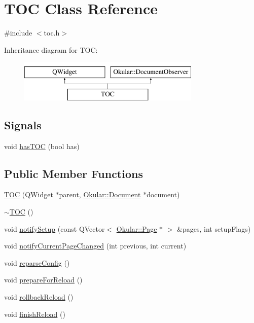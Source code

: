 \hypertarget{classTOC}{\section{T\+O\+C Class Reference}
\label{classTOC}
}


{\ttfamily \#include $<$toc.\+h$>$}

Inheritance diagram for T\+O\+C\+:\begin{figure}[H]
\begin{center}
\leavevmode
\includegraphics[height=2.000000cm]{classTOC}
\end{center}
\end{figure}
\subsection*{Signals}
\begin{DoxyCompactItemize}
\item 
void \hyperlink{classTOC_a0ec67e75322336e78c50725b8240f98e}{has\+T\+O\+C} (bool has)
\end{DoxyCompactItemize}
\subsection*{Public Member Functions}
\begin{DoxyCompactItemize}
\item 
\hyperlink{classTOC_afdab92acfa2df35fe87bdc92a09199ae}{T\+O\+C} (Q\+Widget $\ast$parent, \hyperlink{classOkular_1_1Document}{Okular\+::\+Document} $\ast$document)
\item 
\hyperlink{classTOC_a68efd9d176e9ed6aa05b9b0f9e996c7b}{$\sim$\+T\+O\+C} ()
\item 
void \hyperlink{classTOC_a131d7a59b8c1254fb54e280fb427c640}{notify\+Setup} (const Q\+Vector$<$ \hyperlink{classOkular_1_1Page}{Okular\+::\+Page} $\ast$ $>$ \&pages, int setup\+Flags)
\item 
void \hyperlink{classTOC_a3efaad78d7bec63e5dce884c4e460292}{notify\+Current\+Page\+Changed} (int previous, int current)
\item 
void \hyperlink{classTOC_a99818f663ddf48fa724aabfdadc1a516}{reparse\+Config} ()
\item 
void \hyperlink{classTOC_a2243312419f4c1d2aeb3a426acd80ffc}{prepare\+For\+Reload} ()
\item 
void \hyperlink{classTOC_ae7f5172e41ad71865d59f10faf37fd89}{rollback\+Reload} ()
\item 
void \hyperlink{classTOC_aac786e77326765a857a4d7bc57ccf53b}{finish\+Reload} ()
\end{DoxyCompactItemize}
